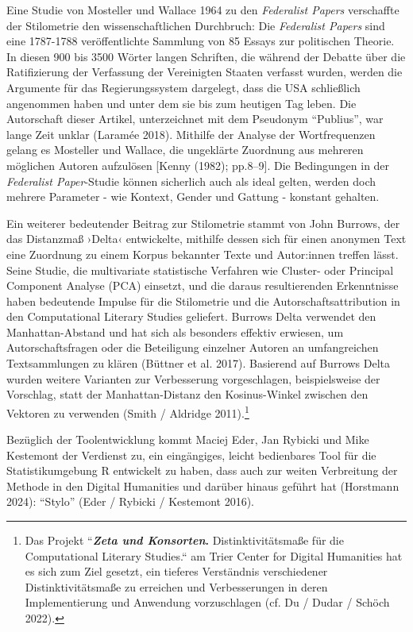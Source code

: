 \documentclass[
  12pt,
  letterpaper,
  DIV=11,
  numbers=noendperiod]{scrreprt}
\begin{document}
Eine Studie von Mosteller und Wallace 1964 zu den \emph{Federalist
Papers} verschaffte der Stilometrie den wissenschaftlichen Durchbruch:
Die \emph{Federalist Papers} sind eine 1787-1788 veröffentlichte
Sammlung von 85 Essays zur politischen Theorie. In diesen 900 bis 3500
Wörter langen Schriften, die während der Debatte über die Ratifizierung
der Verfassung der Vereinigten Staaten verfasst wurden, werden die
Argumente für das Regierungssystem dargelegt, dass die USA schließlich
angenommen haben und unter dem sie bis zum heutigen Tag leben. Die
Autorschaft dieser Artikel, unterzeichnet mit dem Pseudonym ``Publius'',
war lange Zeit unklar (Laramée 2018). Mithilfe der Analyse der
Wortfrequenzen gelang es Mosteller und Wallace, die ungeklärte Zuordnung
aus mehreren möglichen Autoren aufzulösen {[}Kenny (1982); pp.8--9{]}.
Die Bedingungen in der \emph{Federalist Paper}-Studie können sicherlich
auch als ideal gelten, werden doch mehrere Parameter - wie Kontext,
Gender und Gattung - konstant gehalten.

Ein weiterer bedeutender Beitrag zur Stilometrie stammt von John
Burrows, der das Distanzmaß ›Delta‹ entwickelte, mithilfe dessen sich
für einen anonymen Text eine Zuordnung zu einem Korpus bekannter Texte
und Autor:innen treffen lässt. Seine Studie, die multivariate
statistische Verfahren wie Cluster- oder Principal Component Analyse
(PCA) einsetzt, und die daraus resultierenden Erkenntnisse haben
bedeutende Impulse für die Stilometrie und die Autorschaftsattribution
in den Computational Literary Studies geliefert. Burrows Delta verwendet
den Manhattan-Abstand und hat sich als besonders effektiv erwiesen, um
Autorschaftsfragen oder die Beteiligung einzelner Autoren an
umfangreichen Textsammlungen zu klären (Büttner et al. 2017). Basierend
auf Burrows Delta wurden weitere Varianten zur Verbesserung
vorgeschlagen, beispielsweise der Vorschlag, statt der Manhattan-Distanz
den Kosinus-Winkel zwischen den Vektoren zu verwenden (Smith / Aldridge
2011).\footnote{Das Projekt ``\textbf{\emph{Zeta und Konsorten}.}
  Distinktivitätsmaße für die Computational Literary Studies.`` am Trier
  Center for Digital Humanities hat es sich zum Ziel gesetzt, ein
  tieferes Verständnis verschiedener Distinktivitätsmaße zu erreichen
  und Verbesserungen in deren Implementierung und Anwendung
  vorzuschlagen (cf. Du / Dudar / Schöch 2022).}

Bezüglich der Toolentwicklung kommt Maciej Eder, Jan Rybicki und Mike
Kestemont der Verdienst zu, ein eingängiges, leicht bedienbares Tool für
die Statistikumgebung R entwickelt zu haben, dass auch zur weiten
Verbreitung der Methode in den Digital Humanities und darüber hinaus
geführt hat (Horstmann 2024): ``Stylo'' (Eder / Rybicki / Kestemont
2016).
\end{document}
